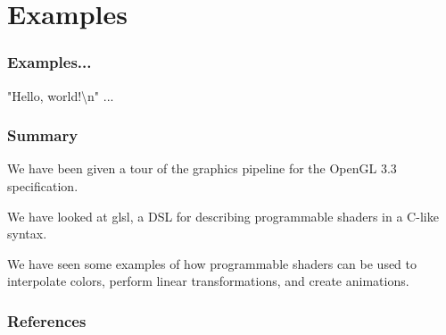 \documentclass{beamer}
\begin{document}
%
%
%
\section{Examples}

\begin{frame}
\frametitle{Examples...}
"Hello, world!\textbackslash{}n" ...
\end{frame}


\begin{frame}
\frametitle{Summary}
We have been given a tour of the graphics pipeline for the OpenGL 3.3
specification.

\vspace{5mm}
We have looked at glsl, a DSL for describing programmable shaders in a C-like
syntax.

\vspace{5mm}
We have seen some examples of how programmable shaders can be used to
interpolate colors, perform linear transformations, and create animations.

\end{frame}

\begin{frame}
\frametitle{References}
\end{frame}



\end{document}
